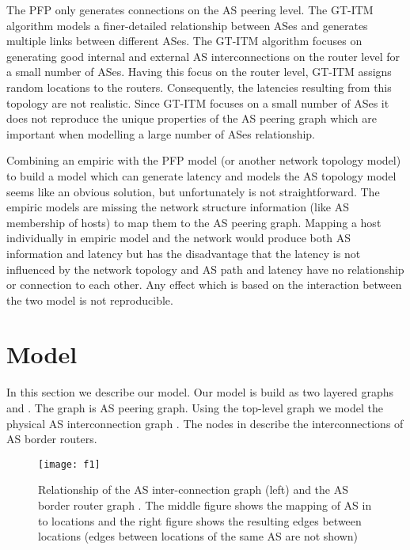 \documentclass{sig-alternate-10pt}
\begin{document}
The PFP only generates connections on the AS peering level. The GT-ITM algorithm \cite{gtitm} models a finer-detailed relationship between ASes and generates multiple links between different ASes. The GT-ITM algorithm focuses on generating good internal and external AS interconnections on the router level for a small number of ASes. Having this focus on the router level, GT-ITM assigns random locations to the routers. Consequently, the latencies resulting from this topology are not realistic. Since GT-ITM focuses on a small number of ASes it does not reproduce the unique properties of the AS peering graph which are important when modelling a large number of ASes relationship. 

Combining an empiric with the PFP model (or another network topology model) to build a model which can generate latency and models the AS topology model seems like an obvious solution, but unfortunately is not straightforward. The empiric models are missing the network structure information (like AS membership of hosts) to map them to the AS peering graph. Mapping a host individually in empiric model and the network would produce both AS information and latency but has the disadvantage that the latency is not influenced by the network topology and AS path and latency have no relationship or connection to each other. Any effect which is based on the interaction between the two model is not reproducible.

 



\section{Model}
\label{sec:model}
In this section we describe our model. Our model is build as two layered graphs  and . The graph  is AS peering graph. Using the top-level graph  we model the physical AS interconnection graph . The nodes in  describe the interconnections of  AS border routers.

\begin{figure*}
{\centering
\texttt{[image: f1]}

}
\caption{Relationship of the AS inter-connection graph  (left) and the AS border router graph . The middle figure shows the mapping of AS in   to locations  and the right figure shows the resulting edges between locations (edges between locations of the same AS are not shown)}
\label{figgundh}
\end{figure*}
\end{document}
